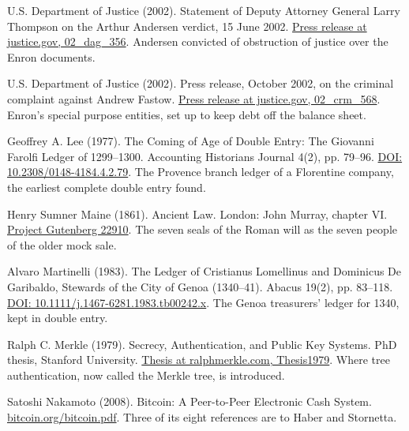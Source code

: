 \documentclass[11pt,twoside]{article}
\theoremstyle{thielethm}
\theoremstyle{thieledef}
\theoremstyle{thieledef}
\theoremstyle{thieledef}
\theoremstyle{thielethm}
\theoremstyle{thieleobs}
\theoremstyle{thielethm}
\begin{document}
\noindent U.S. Department of Justice (2002). Statement of Deputy Attorney General Larry Thompson on the Arthur Andersen verdict, 15 June 2002. \href{https://www.justice.gov/archive/opa/pr/2002/June/02_dag_356.htm}{Press release at justice.gov, 02\_dag\_356}. Andersen convicted of obstruction of justice over the Enron documents.
\par\medskip

\noindent U.S. Department of Justice (2002). Press release, October 2002, on the criminal complaint against Andrew Fastow. \href{https://www.justice.gov/archive/opa/pr/2002/October/02_crm_568.htm}{Press release at justice.gov, 02\_crm\_568}. Enron's special purpose entities, set up to keep debt off the balance sheet.
\par\medskip

\noindent Geoffrey A. Lee (1977). The Coming of Age of Double Entry: The Giovanni Farolfi Ledger of 1299--1300. Accounting Historians Journal 4(2), pp. 79--96. \href{https://doi.org/10.2308/0148-4184.4.2.79}{DOI: 10.2308/0148-4184.4.2.79}. The Provence branch ledger of a Florentine company, the earliest complete double entry found.
\par\medskip

\noindent Henry Sumner Maine (1861). Ancient Law. London: John Murray, chapter VI. \href{https://www.gutenberg.org/ebooks/22910}{Project Gutenberg 22910}. The seven seals of the Roman will as the seven people of the older mock sale.
\par\medskip

\noindent Alvaro Martinelli (1983). The Ledger of Cristianus Lomellinus and Dominicus De Garibaldo, Stewards of the City of Genoa (1340--41). Abacus 19(2), pp. 83--118. \href{https://doi.org/10.1111/j.1467-6281.1983.tb00242.x}{DOI: 10.1111/j.1467-6281.1983.tb00242.x}. The Genoa treasurers' ledger for 1340, kept in double entry.
\par\medskip

\noindent Ralph C. Merkle (1979). Secrecy, Authentication, and Public Key Systems. PhD thesis, Stanford University. \href{https://www.ralphmerkle.com/papers/Thesis1979.pdf}{Thesis at ralphmerkle.com, Thesis1979}. Where tree authentication, now called the Merkle tree, is introduced.
\par\medskip

\noindent Satoshi Nakamoto (2008). Bitcoin: A Peer-to-Peer Electronic Cash System. \href{https://bitcoin.org/bitcoin.pdf}{bitcoin.org/bitcoin.pdf}. Three of its eight references are to Haber and Stornetta.
\par\medskip
\end{document}
